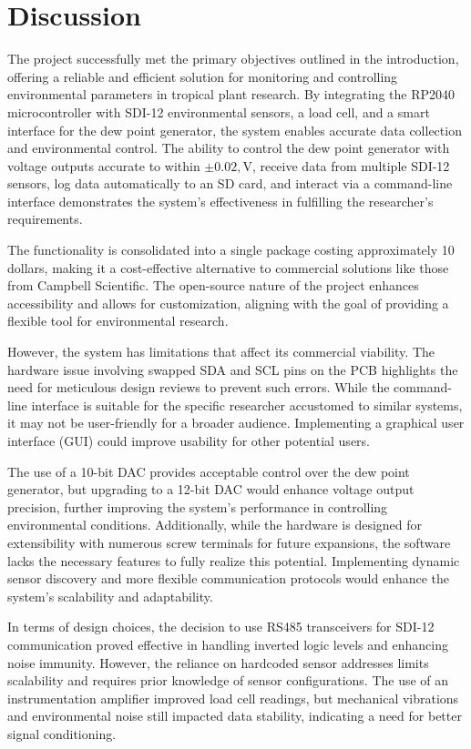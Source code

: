 \section{Discussion}

The project successfully met the primary objectives outlined in the introduction, offering a reliable and efficient solution for monitoring and controlling environmental parameters in tropical plant research. By integrating the RP2040 microcontroller with SDI-12 environmental sensors, a load cell, and a smart interface for the dew point generator, the system enables accurate data collection and environmental control. The ability to control the dew point generator with voltage outputs accurate to within $\pm 0.02,\mathrm{V}$, receive data from multiple SDI-12 sensors, log data automatically to an SD card, and interact via a command-line interface demonstrates the system's effectiveness in fulfilling the researcher's requirements.

The functionality is consolidated into a single package costing approximately 10 dollars, making it a cost-effective alternative to commercial solutions like those from Campbell Scientific. The open-source nature of the project enhances accessibility and allows for customization, aligning with the goal of providing a flexible tool for environmental research.

However, the system has limitations that affect its commercial viability. The hardware issue involving swapped SDA and SCL pins on the PCB highlights the need for meticulous design reviews to prevent such errors. While the command-line interface is suitable for the specific researcher accustomed to similar systems, it may not be user-friendly for a broader audience. Implementing a graphical user interface (GUI) could improve usability for other potential users.

The use of a 10-bit DAC provides acceptable control over the dew point generator, but upgrading to a 12-bit DAC would enhance voltage output precision, further improving the system's performance in controlling environmental conditions. Additionally, while the hardware is designed for extensibility with numerous screw terminals for future expansions, the software lacks the necessary features to fully realize this potential. Implementing dynamic sensor discovery and more flexible communication protocols would enhance the system's scalability and adaptability.

In terms of design choices, the decision to use RS485 transceivers for SDI-12 communication proved effective in handling inverted logic levels and enhancing noise immunity. However, the reliance on hardcoded sensor addresses limits scalability and requires prior knowledge of sensor configurations. The use of an instrumentation amplifier improved load cell readings, but mechanical vibrations and environmental noise still impacted data stability, indicating a need for better signal conditioning.

